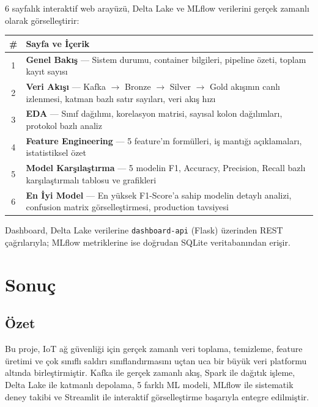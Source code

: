 \documentclass[12pt,a4paper]{article}
\begin{document}
6 sayfalık interaktif web arayüzü, Delta Lake ve MLflow verilerini gerçek zamanlı olarak görselleştirir:

\begin{table}[H]\centering
\begin{tabular}{cp{12cm}}
\toprule
\# & Sayfa ve İçerik \\
\midrule
1 & \textbf{Genel Bakış} — Sistem durumu, container bilgileri, pipeline özeti, toplam kayıt sayısı \\
2 & \textbf{Veri Akışı} — Kafka $\to$ Bronze $\to$ Silver $\to$ Gold akışının canlı izlenmesi, katman bazlı satır sayıları, veri akış hızı \\
3 & \textbf{EDA} — Sınıf dağılımı, korelasyon matrisi, sayısal kolon dağılımları, protokol bazlı analiz \\
4 & \textbf{Feature Engineering} — 5 feature'ın formülleri, iş mantığı açıklamaları, istatistiksel özet \\
5 & \textbf{Model Karşılaştırma} — 5 modelin F1, Accuracy, Precision, Recall bazlı karşılaştırmalı tablosu ve grafikleri \\
6 & \textbf{En İyi Model} — En yüksek F1-Score'a sahip modelin detaylı analizi, confusion matrix görselleştirmesi, production tavsiyesi \\
\bottomrule
\end{tabular}
\end{table}

Dashboard, Delta Lake verilerine \texttt{dashboard-api} (Flask) üzerinden REST çağrılarıyla; MLflow metriklerine ise doğrudan SQLite veritabanından erişir.

\section{Sonuç}

\subsection{Özet}
Bu proje, IoT ağ güvenliği için gerçek zamanlı veri toplama, temizleme, feature üretimi ve çok sınıflı saldırı sınıflandırmasını uçtan uca bir büyük veri platformu altında birleştirmiştir. Kafka ile gerçek zamanlı akış, Spark ile dağıtık işleme, Delta Lake ile katmanlı depolama, 5 farklı ML modeli, MLflow ile sistematik deney takibi ve Streamlit ile interaktif görselleştirme başarıyla entegre edilmiştir.
\end{document}
